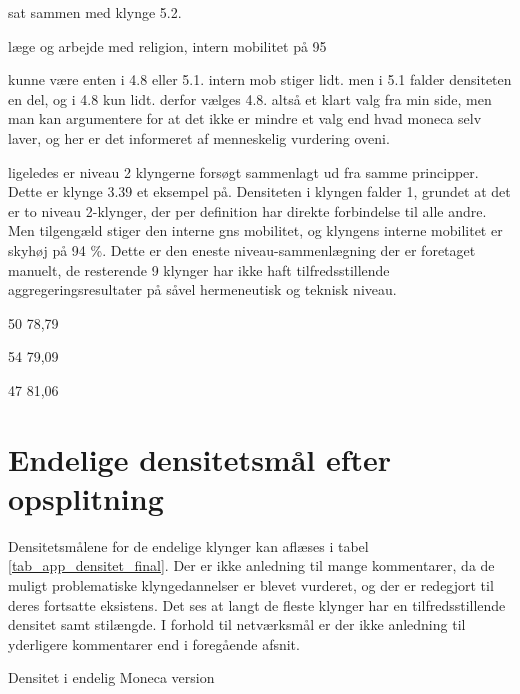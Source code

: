  sat sammen med klynge 5.2. 


læge og arbejde med religion, intern mobilitet på 95 %


 kunne være enten i 4.8 eller 5.1. intern mob stiger lidt. men i 5.1 falder densiteten en del, og i 4.8 kun lidt. derfor vælges 4.8. altså et klart valg fra min side, men man kan argumentere for at det ikke er mindre et valg end hvad moneca selv laver, og her er det informeret af menneskelig vurdering oveni. 


ligeledes er niveau 2 klyngerne forsøgt sammenlagt ud fra samme principper. 
  Dette er klynge 3.39 et eksempel på. Densiteten i klyngen falder 1, grundet at det er to niveau 2-klynger, der per definition har direkte forbindelse til alle andre. Men tilgengæld stiger den interne gns mobilitet, og klyngens interne mobilitet er skyhøj på 94 \%. Dette er den eneste niveau-sammenlægning der er foretaget manuelt, de resterende 9 klynger har ikke haft tilfredsstillende aggregeringsresultater på såvel hermeneutisk og teknisk niveau.  



50 78,79 %

54 79,09 %

47 81,06 %





%
\section{Endelige densitetsmål efter opsplitning}
%

Densitetsmålene for de endelige klynger kan aflæses i tabel \ref{tab_app_densitet_final}. Der er ikke anledning til mange kommentarer, da de muligt problematiske klyngedannelser er blevet vurderet, og der er redegjort til deres fortsatte eksistens. Det ses at langt de fleste klynger har en tilfredsstillende densitet samt stilængde. I forhold til netværksmål er der ikke anledning til yderligere kommentarer end i foregående afsnit. 
%
\begin{table}[H]
  \centering
    \resizebox{5cm}{!}{%

}
  \caption{Densitet i endelig Moneca version}
  \label{tab_app_densitet_final}%
\end{table}
%
